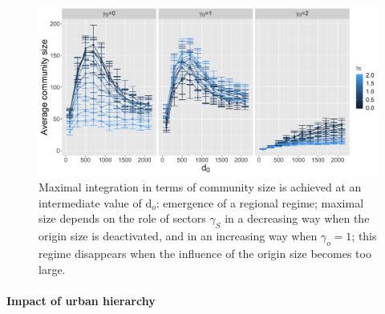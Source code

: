 \documentclass[10pt,letterpaper]{article}
\providecommand{\DIFaddbeginFL}{} %
\providecommand{\DIFaddendFL}{} %
\begin{document}
\begin{figure}
    \DIFaddbeginFL \includegraphics[width=\textwidth]{figures/Fig6.png}
    \DIFaddendFL \vspace{2cm}
	\caption{Maximal integration in terms of community size is achieved at an intermediate value of d$_o$: emergence of a regional regime; maximal size depends on the role of sectors $\gamma_S$ in a decreasing way when the origin size is deactivated, and in an increasing way when $\gamma_o=1$; this regime disappears when the influence of the origin size becomes too large.\label{fig:fig6}}
\end{figure}


\paragraph{Impact of urban hierarchy}
\end{document}
